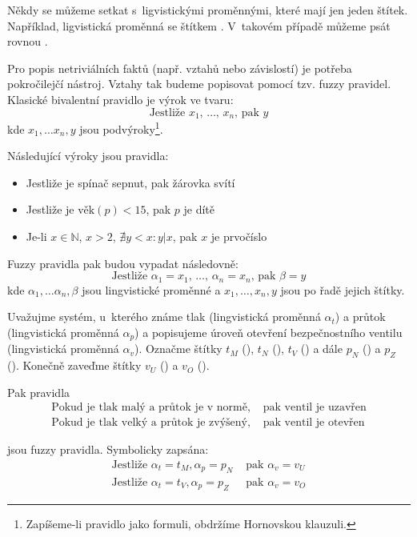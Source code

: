\begin{note}
 Někdy se můžeme setkat s~ligvistickými proměnnými, které mají jen jeden štítek. Například, ligvistická proměnná  se štítkem . V~takovém případě můžeme psát rovnou .
\end{note}

Pro popis netriviálních faktů (např. vztahů nebo závislostí) je potřeba pokročilejčí nástroj. Vztahy tak budeme popisovat pomocí tzv. fuzzy \ifthen pravidel\cite{Jan-FouFuzzContPracAppr}. Klasické bivalentní \ifthen pravidlo je výrok ve tvaru:
$$
 \text{Jestliže $x_1$, $\dots$, $x_n$, pak $y$}
$$
kde $x_1, \dots x_n, y$ jsou podvýroky\footnote{Zapíšeme-li \ifthen pravidlo jako formuli, obdržíme Hornovskou klauzuli.}.

\begin{example}
 Následující výroky jsou \ifthen pravidla:
 \begin{itemize}
  \item Jestliže je spínač sepnut, pak žárovka svítí
  \item Jestliže je $\text{věk}(p) < 15$, pak $p$ je dítě
  \item Je-li $x \in \mathbb{N}$, $x > 2$, $\nexists y < x: y|x$, pak $x$ je prvočíslo
 \end{itemize}
\end{example}

Fuzzy \ifthen pravidla pak budou vypadat následovně:
$$
 \text{Jestliže $\alpha_1 = x_1$, $\dots$, $\alpha_n = x_n$, pak $\beta = y$}
$$
kde $\alpha_1, \dots \alpha_n, \beta$ jsou lingvistické proměnné a $x_1, \dots, x_n, y$ jsou po řadě jejich štítky.


\begin{example}
 Uvažujme systém, u~kterého známe tlak (lingvistická proměnná $\alpha_t$) a průtok (lingvistická proměnná $\alpha_p$) a popisujeme úroveň otevření bezpečnostního ventilu (lingvistická proměnná $\alpha_v$). 
 Označme štítky $t_M$ (), $t_N$ (), $t_V$ () a dále $p_N$ () a $p_Z$ (). Konečně zaveďme štítky $v_U$ () a $v_O$ (). 
 
 Pak pravidla
 \begin{align*}
  \text{Pokud je tlak malý a průtok je v~normě, }&\text{pak ventil je uzavřen} \\
  \text{Pokud je tlak velký a průtok je zvýšený, }&\text{pak ventil je otevřen}
 \end{align*}

 jsou fuzzy \ifthen pravidla. Symbolicky zapsána:
 \begin{align*}
  \text{Jestliže } \alpha_t = t_M, \alpha_p = p_N &\text{ pak } \alpha_v = v_U \\
  \text{Jestliže } \alpha_t = t_V, \alpha_p = p_Z &\text{ pak } \alpha_v = v_O 
 \end{align*}
\end{example}



